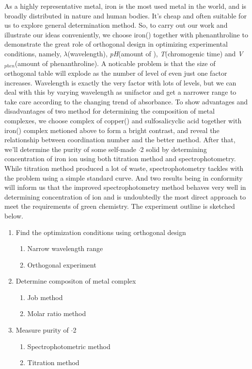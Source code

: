 As a highly representative metal, iron is the most used metal in the world, and is broadly distributed in nature and human bodies. It's cheap and often suitable for us to explore general determination method.
So, to carry out our work and illustrate our ideas conveniently, we choose iron(\uppercase\expandafter{}) together with phenanthroline to demonstrate the great role of orthogonal design in optimizing experimental conditions, namely, $\lambda$(wavelength), \emph{pH}(amount of ), \emph{T}(chromogenic time) and \emph{V$_{phen}$}(amount of phenanthroline). A noticable problem is that the size of orthogonal table will explode as the number of level of even just one factor increases. Wavelength is exactly the very factor with lots of levels, but we can deal with this by varying wavelength as unifactor and get a narrower range to take care according to the changing trend of absorbance.
To show advantages and disadvantages of two method for determining the composition of metal complexes, we choose complex of copper(\uppercase\expandafter{}) and sulfosalicyclic acid together with iron(\uppercase\expandafter{}) complex metioned above to form a bright contrast, and reveal the relationship between coordination number and the better method.
After that, we'll determine the purity of some self-made $\cdot$2 solid by determining concentration of iron ion using both titration method and spectrophotometry. While titration method produced a lot of waste, spectrophotometry tackles with the problem using a simple standard curve. And two results being in conformity will inform us that the improved spectrophotometry method behaves very well in determining concentration of ion and is undoubtedly the most direct approach to meet the requirements of green chemistry. The experiment outline is sketched below.
\begin{enumerate}
	\item Find the optimization conditions using orthogonal design
	\begin{enumerate}
		\item Narrow wavelength range
		\item Orthogonal experiment
	\end{enumerate}
	\item Determine compositon of metal complex
	\begin{enumerate}
		\item Job method
		\item Molar ratio method
	\end{enumerate}
	\item Measure purity of $\cdot$2
	\begin{enumerate}
		\item Spectrophotometric method
		\item Titration method
	\end{enumerate}
\end{enumerate}


\ifx\SUM\undefined


\fi
